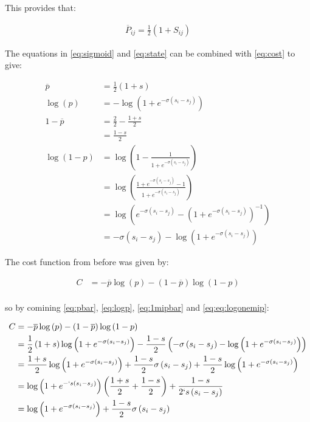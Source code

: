 \documentclass[a4paper,11pt,twoside]{article}
\begin{document}
This provides that:

\begin{align}
      \overline{P}_{ij}= \frac{1}{2}\left( 1 +  S_{ij} \right) \label{eq:state}
\end{align}


The equations in \eqref{eq:sigmoid} and \eqref{eq:state} can be combined with \eqref{eq:cost} to give:


\begin{align}
    \overline{p} &= \frac{1}{2}\left( 1+ s \right) \label{eq:pbar} \\
    \log\left( p \right) &= - \log\left( 1 +  e^{- \sigma\left( s_i - s_j \right)} \right) \label{eq:logp} \\
    1- \overline{p} &= \frac{2}{2} - \frac{1+ s}{2} \label{eq:1mipbar}\\
    &= \frac{1- s}{2} \\
    \log\left( 1- p \right) &= \log\left( 1 -  \frac{1}{1 +  e^{- \sigma\left( s_i - s_j \right)}} \right) \\
    &= \log\left( \frac{1 +  e^{- \sigma\left( s_i - s_j \right)}-1}{1 +  e^{- \sigma\left( s_i - s_j \right)}} \right) \\
    &= \log \left( e^{- \sigma\left( s_i - s_j \right)} - \left( 1 +  e^{- \sigma \left( s_i - s_j \right)} \right)^{- 1} \right) \\
    &= - \sigma \left( s_i - s_j \right) - \log \left( 1 +  e^{- \sigma \left( s_i - s_j \right)} \right) \label{eq:logonemip}
\end{align}


The cost function from before was given by:

\begin{align}
    C &= - \overline{p} \log\left( p \right)- \left( 1 -  \overline{p} \right) \log\left( 1 - p \right) \\
\end{align}

so by comining \eqref{eq:pbar}, \eqref{eq:logp}, \eqref{eq:1mipbar} and \eqref{eq:eq:logonemip}:

\begin{align}
    C &= - \overline{p} \log\left( p \right)- \left( 1 -  \overline{p} \right) \log\left( 1 - p \right) \\
     &= \frac{1}{2}\left( 1 +  s \right)\log\left( 1 +  e^{- \sigma \left( s_i - s_j \right)} \right) - \frac{1- s}{2} \left( - \sigma \left( s_i - s_j \right) - \log\left( 1 +  e^{- \sigma \left( s_i - s_j \right)} \right) \right) \\
    &= \frac{1+ s}{2} \log\left( 1 +  e^{- \sigma\left( s_i - s_j \right)} \right) +  \frac{1- s}{2}\sigma \left( s_i - s_j \right)+  \frac{1- s}{2} \log \left(  1 +  e^{ -  \sigma \left( s_i - s_j \right)} \right) \\
    &= \log \left( 1 +  e^{ - `s \left( s_i - s_j \right)} \right) \left( \frac{1 +  s}{2} +  \frac{1 - s}{2} \right) +  \frac{1 - s}{2 `s \left( s_i - s_j \right)} \\
    &= \log \left( 1 +  e ^{- \sigma \left( s_i - s_j \right)}   \right) +  \frac{1 - s}{2 } \sigma \left( s_i -  s_j \right)
\end{align}
\end{document}
